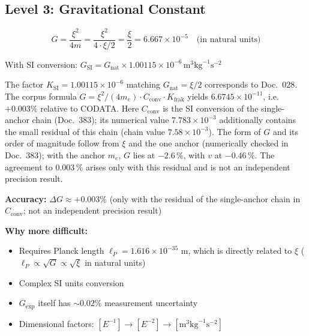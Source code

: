	\subsection{Level 3: Gravitational Constant}
	
	\begin{equation}
		G = \frac{\xi^2}{4m} = \frac{\xi^2}{4 \cdot \xi/2} = \frac{\xi}{2} = 6.667 \times 10^{-5} \quad \text{(in natural units)}
	\end{equation}
	
	With SI conversion: $G_{\text{SI}} = G_{\text{nat}} \times 1.00115 \times 10^{-6}\,\text{m}^3\text{kg}^{-1}\text{s}^{-2}$
	
	The factor $K_{\text{SI}} = 1.00115\times10^{-6}$ matching $G_{\text{nat}} = \xi/2$ corresponds to Doc.~028. The corpus formula $G = \xi^2/(4m_e)\cdot C_{\text{conv}}\cdot K_{\text{frak}}$ yields $6.6745\times10^{-11}$, i.e.\ $+0.003\%$ relative to CODATA. Here $C_{\text{conv}}$ is the SI conversion of the single-anchor chain (Doc.~383); its numerical value $7.783\times10^{-3}$ additionally contains the small residual of this chain (chain value $7.58\times10^{-3}$). The form of $G$ and its order of magnitude follow from $\xi$ and the one anchor (numerically checked in Doc.~383); with the anchor $m_e$, $G$ lies at $-2.6\,\%$, with $v$ at $-0.46\,\%$. The agreement to $0.003\,\%$ arises only with this residual and is not an independent precision result.
	
	\begin{tcolorbox}[colback=yellow!5!white,colframe=orange!75!black,title={Complex $\xi$-Form}]
		\textbf{Accuracy:} $\Delta G \approx +0.003\%$ (only with the residual of the single-anchor chain in $C_{\text{conv}}$; not an independent precision result)
		
		\textbf{Why more difficult:}
		\begin{itemize}
			\item Requires Planck length $\ell_P = 1.616 \times 10^{-35}$ m, which is directly related to $\xi$ ($\ell_P \propto \sqrt{G} \propto \sqrt{\xi}$ in natural units)
			\item Complex SI units conversion
			\item $G_{\exp}$ itself has $\sim 0.02\%$ measurement uncertainty
			\item Dimensional factors: $[E^{-1}] \to [E^{-2}] \to [\text{m}^3\text{kg}^{-1}\text{s}^{-2}]$
		\end{itemize}
	\end{tcolorbox}
	
